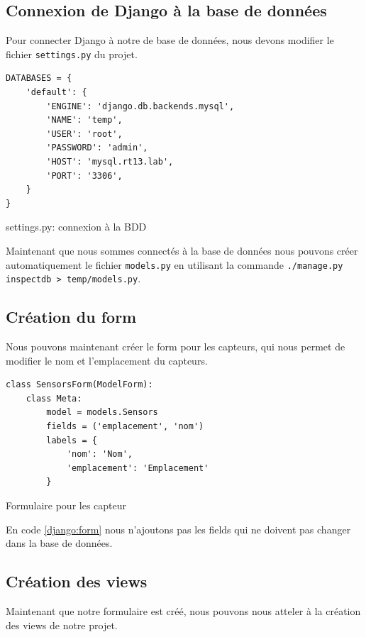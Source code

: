 \documentclass{article}
\begin{document}
\subsection{Connexion de Django à la base de données}
Pour connecter Django à notre de base de données, nous devons modifier le fichier \verb|settings.py| du projet.
\begin{listing}[H]
    \begin{verbatim}
DATABASES = {
    'default': {
        'ENGINE': 'django.db.backends.mysql',
        'NAME': 'temp',
        'USER': 'root',
        'PASSWORD': 'admin',
        'HOST': 'mysql.rt13.lab',
        'PORT': '3306',
    }
}
    \end{verbatim}
    \caption{settings.py: connexion à la BDD}
    \label{django:bddconn}
\end{listing}
Maintenant que nous sommes connectés à la base de données nous pouvons créer automatiquement le fichier \verb|models.py| en utilisant la commande \verb|./manage.py inspectdb > temp/models.py|.

\subsection{Création du form}
Nous pouvons maintenant créer le form pour les capteurs, qui nous permet de modifier le nom et l'emplacement du capteurs.
\begin{listing}[H]
    \begin{verbatim}
class SensorsForm(ModelForm):
    class Meta:
        model = models.Sensors
        fields = ('emplacement', 'nom')
        labels = {
            'nom': 'Nom',
            'emplacement': 'Emplacement'
        }
    \end{verbatim}
    \caption{Formulaire pour les capteur}
    \label{django:form}
\end{listing}
En code \ref{django:form} nous n'ajoutons pas les fields qui ne doivent pas changer dans la base de données.

\newpage
\subsection{Création des views}
Maintenant que notre formulaire est créé, nous pouvons nous atteler à la création des views de notre projet.
\end{document}
